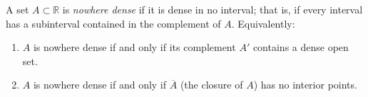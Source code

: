 A set $A \subset \mathbb{R}$ is \textit{nowhere dense} if it is dense in no interval; that is, if every interval has a subinterval contained in the complement of $A$. Equivalently:

\begin{enumerate}
  \item $A$ is nowhere dense if and only if its complement $A'$ contains a dense open set.
  \item $A$ is nowhere dense if and only if $\overline{A}$ (the closure of $A$) has no interior points.
\end{enumerate}
